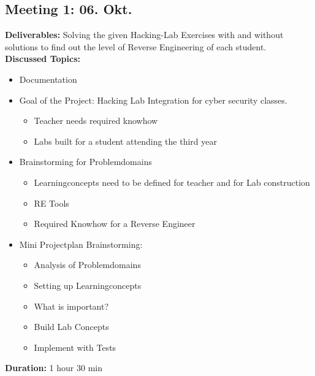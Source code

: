\subsection*{Meeting 1: 06. Okt.}
\textbf{Deliverables:} Solving the given Hacking-Lab Exercises with and without solutions to find out the level of Reverse Engineering of each student. \\
\textbf{Discussed Topics:} 
\begin{itemize}
    \item Documentation
    \item Goal of the Project: Hacking Lab Integration for cyber security classes.
    \begin{itemize}
        \item Teacher needs required knowhow
        \item Labs built for a student attending the third year
    \end{itemize}
    \item Brainstorming for Problemdomains
    \begin{itemize}
        \item Learningconcepts need to be defined for teacher and for Lab construction
        \item RE Tools
        \item Required Knowhow for a Reverse Engineer
    \end{itemize}
    \item Mini Projectplan Brainstorming:
    \begin{itemize}
        \item Analysis of Problemdomains
        \item Setting up Learningconcepts
        \item What is important?
        \item Build Lab Concepts
        \item Implement with Tests
    \end{itemize}
\end{itemize}
\textbf{Duration:} 1 hour 30 min

